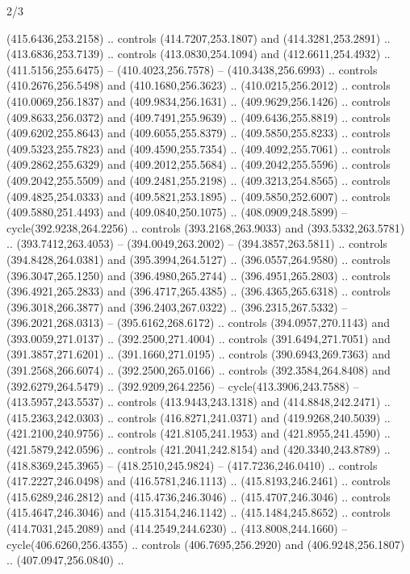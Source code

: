 \begin{flagdescription}{2/3}
\begin{scope}[xshift=0.5\flaglength,yshift=0.5\flagwidth,scale=\flagwidth/495.65]
\begin{scope}[y=0.8pt, x=0.8pt, yscale=-1,shift={(-463.76,-309.78)}]
  (415.6436,253.2158) .. controls (414.7207,253.1807) and (414.3281,253.2891) ..
  (413.6836,253.7139) .. controls (413.0830,254.1094) and (412.6611,254.4932) ..
  (411.5156,255.6475) -- (410.4023,256.7578) -- (410.3438,256.6993) .. controls
  (410.2676,256.5498) and (410.1680,256.3623) .. (410.0215,256.2012) .. controls
  (410.0069,256.1837) and (409.9834,256.1631) .. (409.9629,256.1426) .. controls
  (409.8633,256.0372) and (409.7491,255.9639) .. (409.6436,255.8819) .. controls
  (409.6202,255.8643) and (409.6055,255.8379) .. (409.5850,255.8233) .. controls
  (409.5323,255.7823) and (409.4590,255.7354) .. (409.4092,255.7061) .. controls
  (409.2862,255.6329) and (409.2012,255.5684) .. (409.2042,255.5596) .. controls
  (409.2042,255.5509) and (409.2481,255.2198) .. (409.3213,254.8565) .. controls
  (409.4825,254.0333) and (409.5821,253.1895) .. (409.5850,252.6007) .. controls
  (409.5880,251.4493) and (409.0840,250.1075) .. (408.0909,248.5899) --
  cycle(392.9238,264.2256) .. controls (393.2168,263.9033) and
  (393.5332,263.5781) .. (393.7412,263.4053) -- (394.0049,263.2002) --
  (394.3857,263.5811) .. controls (394.8428,264.0381) and (395.3994,264.5127) ..
  (396.0557,264.9580) .. controls (396.3047,265.1250) and (396.4980,265.2744) ..
  (396.4951,265.2803) .. controls (396.4921,265.2833) and (396.4717,265.4385) ..
  (396.4365,265.6318) .. controls (396.3018,266.3877) and (396.2403,267.0322) ..
  (396.2315,267.5332) -- (396.2021,268.0313) -- (395.6162,268.6172) .. controls
  (394.0957,270.1143) and (393.0059,271.0137) .. (392.2500,271.4004) .. controls
  (391.6494,271.7051) and (391.3857,271.6201) .. (391.1660,271.0195) .. controls
  (390.6943,269.7363) and (391.2568,266.6074) .. (392.2500,265.0166) .. controls
  (392.3584,264.8408) and (392.6279,264.5479) .. (392.9209,264.2256) --
  cycle(413.3906,243.7588) -- (413.5957,243.5537) .. controls
  (413.9443,243.1318) and (414.8848,242.2471) .. (415.2363,242.0303) .. controls
  (416.8271,241.0371) and (419.9268,240.5039) .. (421.2100,240.9756) .. controls
  (421.8105,241.1953) and (421.8955,241.4590) .. (421.5879,242.0596) .. controls
  (421.2041,242.8154) and (420.3340,243.8789) .. (418.8369,245.3965) --
  (418.2510,245.9824) -- (417.7236,246.0410) .. controls (417.2227,246.0498) and
  (416.5781,246.1113) .. (415.8193,246.2461) .. controls (415.6289,246.2812) and
  (415.4736,246.3046) .. (415.4707,246.3046) .. controls (415.4647,246.3046) and
  (415.3154,246.1142) .. (415.1484,245.8652) .. controls (414.7031,245.2089) and
  (414.2549,244.6230) .. (413.8008,244.1660) -- cycle(406.6260,256.4355) ..
  controls (406.7695,256.2920) and (406.9248,256.1807) .. (407.0947,256.0840) ..

\end{scope}
\end{scope}
\end{flagdescription}

